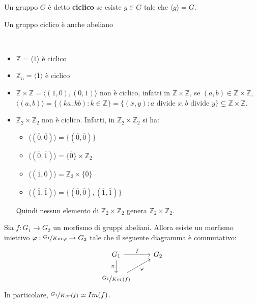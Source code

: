 \documentclass[../main.tex]{subfiles}
\begin{document}
\begin{definition}
    Un gruppo $G$ è detto \textbf{ciclico} se esiste $g \in G$ tale che $\langle g \rangle = G$.

    Un gruppo ciclico è anche abeliano
\end{definition}

\begin{example}
    \
    \begin{itemize}
        \item $\mathbb{Z} = \langle 1 \rangle$ è ciclico
        \item $\mathbb{Z}_n = \langle \overline{1} \rangle$ è ciclico
        \item $\mathbb{Z} \times \mathbb{Z} = \langle (1,0), (0,1) \rangle$ non è ciclico,
              infatti in $\mathbb{Z}  \times \mathbb{Z} $, se $(a,b) \in \mathbb{Z} \times \mathbb{Z} $,
              $\langle (a,b) \rangle = \{(ka,kb) : k \in \mathbb{Z} \} = \{(x,y) : a \text{ divide } x,b \text{ divide } y\}
                  \subsetneq \mathbb{Z} \times \mathbb{Z} $.
        \item $\mathbb{Z}_2 \times \mathbb{Z}_2$ non è ciclico. Infatti, in $\mathbb{Z}_2 \times \mathbb{Z}_2$ si ha:
              \
              \begin{itemize}
                  \item $\langle (\overline{0},\overline{0}) \rangle = \{(\overline{0},\overline{0})\}$
                  \item $\langle (\overline{0}, \overline{1}) \rangle = \{\overline{0}\} \times \mathbb{Z}_2$
                  \item  $\langle (\overline{1}, \overline{0}) \rangle = \mathbb{Z}_2 \times \{\overline{0}\}$
                  \item $\langle (\overline{1}, \overline{1}) \rangle = \{(\overline{0},\overline{0}),(\overline{1},\overline{1})\}$
              \end{itemize}
              Quindi nessun elemento di $\mathbb{Z}_2 \times \mathbb{Z}_2$ genera $\mathbb{Z}_2 \times \mathbb{Z}_2$.
    \end{itemize}
\end{example}

\begin{theorem}
    Sia $f: G_1 \rightarrow G_2$ un morfismo di gruppi abeliani. Allora esiste un morfismo iniettivo $\varphi : \nicefrac{G_1}{Ker \varphi} \rightarrow G_2$ tale che il seguente diagramma è commutativo:
    \begin{equation*}
        \begin{tikzcd}
            G_1 \arrow[r, "f"] \arrow[d, "\pi"'] & G_2 \\
            \nicefrac{G_1}{Ker(f)} \arrow[ru, "\varphi"']
        \end{tikzcd}
    \end{equation*}
    In particolare, $\nicefrac{G_1}{Ker(f)} \simeq Im(f)$.
\end{theorem}
\end{document}
